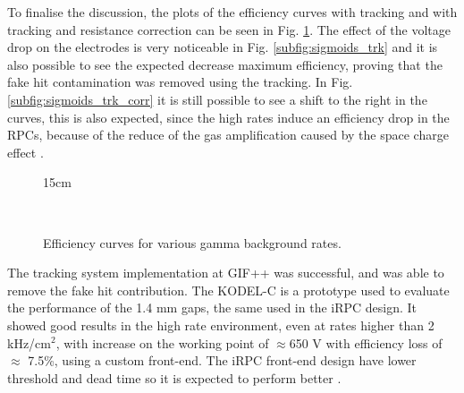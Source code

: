 To finalise the discussion, the plots of the efficiency curves with tracking and with tracking and resistance correction can be seen in Fig. \ref{fig:eff_curves}. The effect of the voltage drop on the electrodes is very noticeable in Fig. \ref{subfig:sigmoids_trk} and it is also possible to see the expected decrease maximum efficiency, proving that the fake hit contamination was removed using the tracking. In Fig. \ref{subfig:sigmoids_trk_corr} it is still possible to see a shift to the right in the curves, this is also expected, since the high rates induce an efficiency drop in the RPCs, because of the reduce of the gas amplification caused by the space charge effect \cite{Lippmann:2003yb}. 

\begin{figure}[!htm]{15cm}
  \caption{Efficiency curves for various gamma background rates.} 
  \label{fig:eff_curves}
  \hfill
  \\
\end{figure}

The tracking system implementation at GIF++ was successful, and was able to remove the fake hit contribution. The KODEL-C is a prototype used to evaluate the performance of the 1.4 mm gaps, the same used in the iRPC design. It showed good results in the high rate environment, even at rates higher than 2 kHz/cm$^2$, with increase on the working point of $\approx$650 V with efficiency loss of $\approx$ 7.5\%, using a custom front-end. The iRPC front-end design have lower threshold and dead time so it is expected to perform better \cite{CMS:2021bxv}.